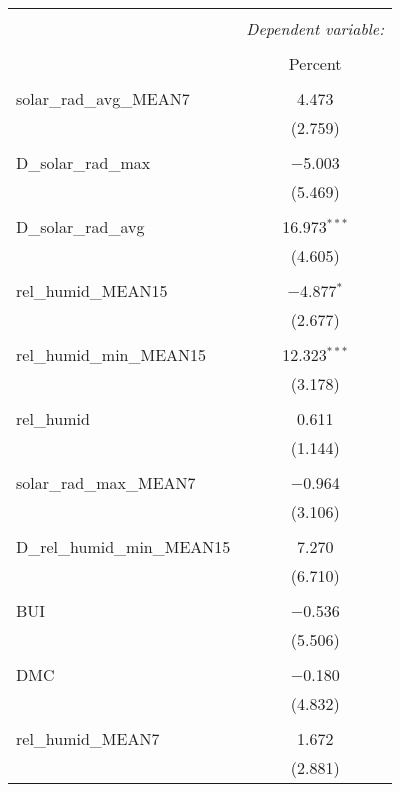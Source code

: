 
\begin{table}[!htbp] \centering 
  \caption{} 
  \label{} 
\begin{tabular}{@{\extracolsep{5pt}}lc} 
\\[-1.8ex]\hline 
\hline \\[-1.8ex] 
 & \multicolumn{1}{c}{\textit{Dependent variable:}} \\ 
\cline{2-2} 
\\[-1.8ex] & Percent \\ 
\hline \\[-1.8ex] 
 solar\_rad\_avg\_MEAN7 & 4.473 \\ 
  & (2.759) \\ 
  & \\ 
 D\_solar\_rad\_max & $-$5.003 \\ 
  & (5.469) \\ 
  & \\ 
 D\_solar\_rad\_avg & 16.973$^{***}$ \\ 
  & (4.605) \\ 
  & \\ 
 rel\_humid\_MEAN15 & $-$4.877$^{*}$ \\ 
  & (2.677) \\ 
  & \\ 
 rel\_humid\_min\_MEAN15 & 12.323$^{***}$ \\ 
  & (3.178) \\ 
  & \\ 
 rel\_humid & 0.611 \\ 
  & (1.144) \\ 
  & \\ 
 solar\_rad\_max\_MEAN7 & $-$0.964 \\ 
  & (3.106) \\ 
  & \\ 
 D\_rel\_humid\_min\_MEAN15 & 7.270 \\ 
  & (6.710) \\ 
  & \\ 
 BUI & $-$0.536 \\ 
  & (5.506) \\ 
  & \\ 
 DMC & $-$0.180 \\ 
  & (4.832) \\ 
  & \\ 
 rel\_humid\_MEAN7 & 1.672 \\ 
  & (2.881) \\ 

\end{tabular}
\end{table}

